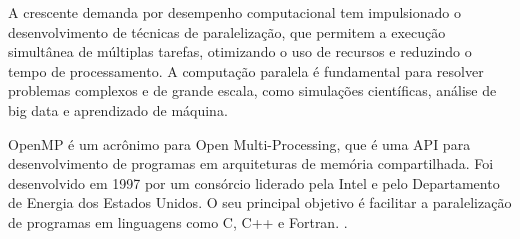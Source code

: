 A crescente demanda por desempenho computacional tem impulsionado o desenvolvimento de técnicas de paralelização, que permitem a execução simultânea de múltiplas tarefas, otimizando o uso de recursos e reduzindo o tempo de processamento. A computação paralela é fundamental para resolver problemas complexos e de grande escala, como simulações científicas, análise de big data e aprendizado de máquina.

\par OpenMP é um acrônimo para Open Multi-Processing, que é uma API para desenvolvimento de programas em arquiteturas de memória compartilhada. Foi desenvolvido em 1997 por um consórcio liderado pela Intel e pelo Departamento de Energia dos Estados Unidos. O seu principal objetivo é facilitar a paralelização de programas em linguagens como C, C++ e Fortran. \cite{cornell_openmp_history}.
